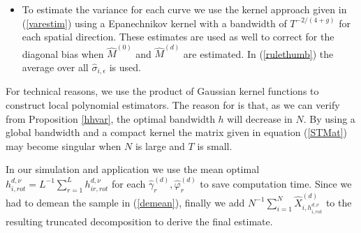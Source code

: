 \begin{itemize}
			\item \label{estsig}
To estimate the variance for each curve we use the kernel approach given in (\ref{varestim}) using a Epanechnikov kernel with a bandwidth of $T^{-2/(4+g)}$ for each spatial direction. These estimates are used as well to correct for the diagonal bias when $\hat{M}^{(0)}$ and $\hat{M}^{(d)}$ are estimated. In (\ref{rulethumb}) the average over all $\hat{\sigma}_{i,\epsilon}$ is used. %

\end{itemize}

For technical reasons, we use the product of Gaussian kernel functions to construct local polynomial estimators. The reason for is that, as we can verify from Proposition \ref{hhvar}, the optimal bandwidth $h$ will decrease in $N$. By using a global bandwidth and a compact kernel the matrix given in equation (\ref{STMat}) may become singular when $N$ is large and $T$ is small. 

% 
 In our simulation and application we use the mean optimal $h^{d,\nu}_{i,rot}= L^{-1} \sum_{r=1}^L h^{d,\nu}_{ir,rot} $ for each $\hat{\gamma}^{(d)}_r, \hat{\varphi}^{(d)}_r$ to save computation time. %
Since we had to demean the sample in (\ref{demean}), finally we add  $N^{-1} \sum_{i=1}^N \hat{X}^{(d)}_{i,h^{d,\nu}_{i,rot}}$ to the resulting truncated decomposition to derive the final estimate.



